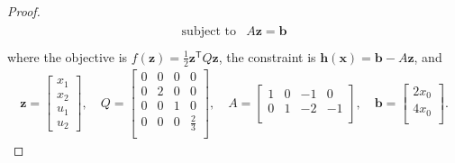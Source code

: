 \documentclass[12pt]{article}
\theoremstyle{definition}
\newcommand{\vc}[1]{\boldsymbol{#1}}
\newcommand{\tran}{\mathsf{T}}
\begin{document}
\begin{proof}
\begin{align}
\begin{array}{rl}
      \text{subject to} & A \vc{z} = \vc{b}\\
    \end{array}
  \end{align}
  where the objective is $f(\vc{z}) = \frac{1}{2} \vc{z}^\tran Q \vc{z}$, the constraint is $\vc{h}(\vc{x}) = \vc{b}-A \vc{z} $, and
  \begin{align}\label{defs}
    \vc{z} = \begin{bmatrix}x_1 \\ x_2 \\ u_1 \\ u_2\end{bmatrix}, \quad
    Q =
    \begin{bmatrix}
      0 & 0 & 0 & 0 \\
      0 & 2 & 0 & 0 \\
      0 & 0 & 1 & 0 \\
      0 & 0 & 0 & \frac{2}{3} \\
   \end{bmatrix}, \quad
   A =
   \begin{bmatrix}
      1 & 0 & -1 & 0 \\
      0 & 1 & -2 & -1 \\
   \end{bmatrix}, \quad
   \vc{b} =
   \begin{bmatrix}
     2x_0 \\
     4x_0 \\
   \end{bmatrix}.
  \end{align}


\end{proof}
\end{document}
